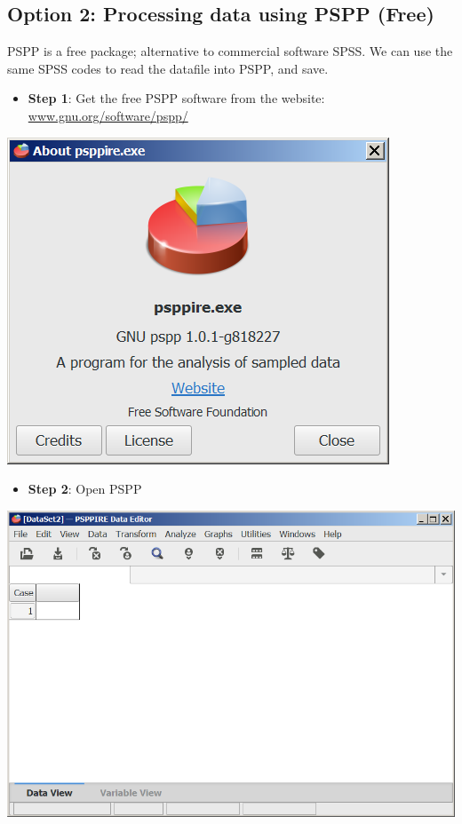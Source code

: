 \documentclass[
]{book}
\providecommand{\tightlist}{%
  \setlength{\itemsep}{0pt}\setlength{\parskip}{0pt}}
\begin{document}
\hypertarget{option-2-processing-data-using-pspp-free}{%
\subsection{Option 2: Processing data using PSPP (Free)}\label{option-2-processing-data-using-pspp-free}}

PSPP is a free package; alternative to commercial software SPSS. We can use the same SPSS codes to read the datafile into PSPP, and save.

\begin{itemize}
\tightlist
\item
  \textbf{Step 1}: Get the free PSPP software from the website: \href{http://www.gnu.org/software/pspp/}{www.gnu.org/software/pspp/}
\end{itemize}

\includegraphics[width=0.65\linewidth]{images/abacus30}

\begin{itemize}
\tightlist
\item
  \textbf{Step 2}: Open PSPP
\end{itemize}

\includegraphics[width=0.65\linewidth]{images/abacus31}
\end{document}
